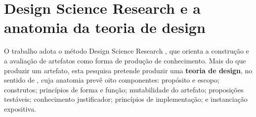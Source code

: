 
\section{Design Science Research e a anatomia da teoria de design}
O trabalho adota o método Design Science Research \cite{Hevner2004,Peffers2007}, que orienta a construção e a avaliação de artefatos como forma de produção de conhecimento. Mais do que produzir um artefato, esta pesquisa pretende produzir uma \textbf{teoria de design}, no sentido de \cite{DesignTheory}, cuja anatomia prevê oito componentes: propósito e escopo; construtos; princípios de forma e função; mutabilidade do artefato; proposições testáveis; conhecimento justificador; princípios de implementação; e instanciação expositiva. 








